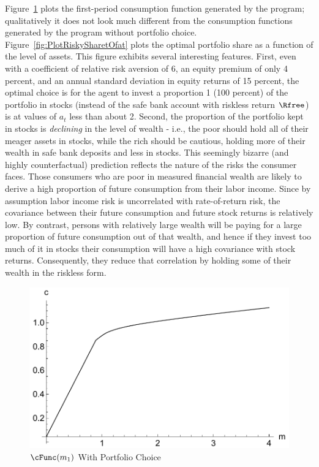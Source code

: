 \documentclass[titlepage]{\econtex}
\begin{document}
Figure~\ref{fig:PlotctMultContr} plots the first-period consumption
function generated by the program; qualitatively it does not look much
different from the consumption functions generated by the program
without portfolio choice.  Figure~\ref{fig:PlotRiskySharetOfat} plots the
optimal portfolio share as a function of the level of assets.  This
figure exhibits several interesting features.  First, even with a
coefficient of relative risk aversion of 6, an equity premium of only
4 percent, and an annual standard deviation in equity returns of 15
percent, the optimal choice is for the agent
to invest a proportion 1 (100 percent) of the portfolio in stocks (instead of the safe bank account with riskless return $\Rfree$) is
at values of ${a}_{t}$ less than about 2.  Second, the
proportion of the portfolio kept in stocks is \textit{declining} in the
level of wealth - i.e., the poor should hold all of their meager
assets in stocks, while the rich should be cautious, holding more of
their wealth in safe bank deposits and less in stocks.  This
seemingly bizarre (and highly counterfactual) prediction reflects the
nature of the risks the consumer faces.  Those consumers who are poor
in measured financial wealth are likely to derive a high proportion of
future consumption from their labor income.  Since by assumption labor
income risk is uncorrelated with rate-of-return risk, the covariance
between their future consumption and future stock returns is
relatively low.  By contrast, persons with relatively large wealth
will be paying for a large proportion of future consumption out of that
wealth, and hence if they invest too much of it in stocks their consumption
will have a high covariance with stock returns.  Consequently, they
reduce that correlation by holding some of their wealth in the
riskless form.

\hypertarget{PlotctMultContr}{}
\begin{figure}
        \includegraphics{./Figures/PlotctMultContr}
        \caption{$\cFunc({m}_{1})$ With Portfolio Choice}
        \label{fig:PlotctMultContr}
\end{figure}
\end{document}
